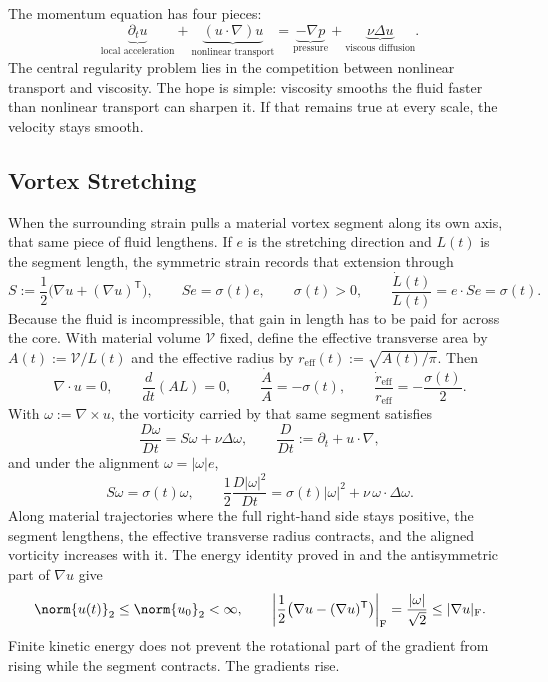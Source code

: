
The momentum equation has four pieces:
\[
  \underbrace{\partial_t u}_{\text{local acceleration}}
  +
  \underbrace{(u\cdot\nabla)u}_{\text{nonlinear transport}}
  =
  \underbrace{-\nabla p}_{\text{pressure}}
  +
  \underbrace{\nu\Delta u}_{\text{viscous diffusion}}.
\]
The central regularity problem lies in the competition between nonlinear transport and viscosity.
The hope is simple: viscosity smooths the fluid faster than nonlinear transport can sharpen it.
If that remains true at every scale, the velocity stays smooth.

\subsection{Vortex Stretching}\label{sub:ThePerfectlyStretchingVortex}

When the surrounding strain pulls a material vortex segment along its own axis, that same piece of fluid lengthens. If \(e\) is the stretching direction and \(L(t)\) is the segment length, the symmetric strain records that extension through
\[
  S:=\frac12\bigl(\nabla u+(\nabla u)^{\mathsf T}\bigr),
  \qquad
  Se=\sigma(t)e,
  \qquad
  \sigma(t)>0,
  \qquad
  \frac{\dot L(t)}{L(t)}
  =
  e\cdot Se
  =
  \sigma(t).
\]
Because the fluid is incompressible, that gain in length has to be paid for across the core. With material volume \(\mathcal V\) fixed, define the effective transverse area by \(A(t):=\mathcal V/L(t)\) and the effective radius by \(r_{\mathrm{eff}}(t):=\sqrt{A(t)/\pi}\). Then
\[
  \nabla\cdot u=0,
  \qquad
  \frac{d}{dt}(A L)=0,
  \qquad
  \frac{\dot A}{A}=-\sigma(t),
  \qquad
  \frac{\dot r_{\mathrm{eff}}}{r_{\mathrm{eff}}}
  =
  -\frac{\sigma(t)}{2}.
\]
With \(\omega:=\nabla\times u\), the vorticity carried by that same segment satisfies
\[
  \frac{D\omega}{Dt}
  =
  S\omega+\nu\Delta\omega,
  \qquad
  \frac{D}{Dt}
  :=
  \partial_t+u\cdot\nabla,
\]
and under the alignment \(\omega=|\omega|e\),
\[
  S\omega
  =
  \sigma(t)\omega,
  \qquad
  \frac12\frac{D|\omega|^2}{Dt}
  =
  \sigma(t)|\omega|^2
  +
  \nu\,\omega\cdot\Delta\omega.
\]
Along material trajectories where the full right-hand side stays positive, the segment lengthens, the effective transverse radius contracts, and the aligned vorticity increases with it. The energy identity proved in  and the antisymmetric part of \(\nabla u\) give
\[
  \norm{u(t)}_2
  \leq
  \norm{u_0}_2
  <\infty,
  \qquad
  \left|\frac12\bigl(\nabla u-(\nabla u)^{\mathsf T}\bigr)\right|_{\mathrm F}
  =
  \frac{|\omega|}{\sqrt2}
  \leq
  |\nabla u|_{\mathrm F}.
\]
Finite kinetic energy does not prevent the rotational part of the gradient from rising while the segment contracts. The gradients rise.

